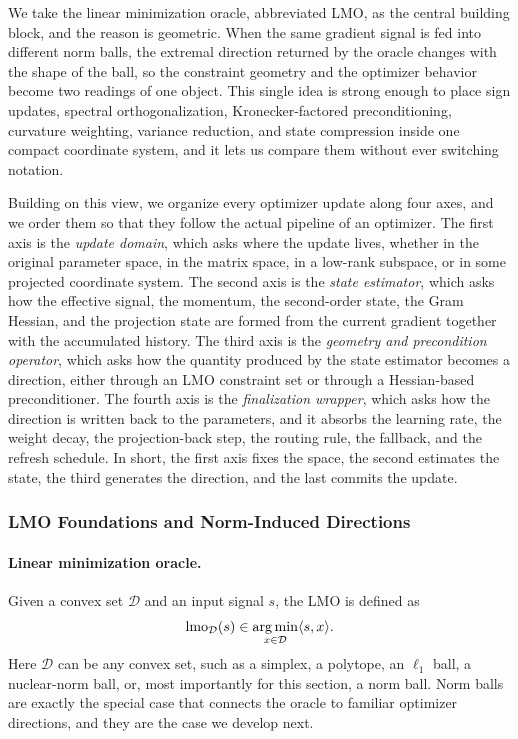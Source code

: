 We take the linear minimization oracle, abbreviated LMO, as the central building block, and the reason is geometric. When the same gradient signal is fed into different norm balls, the extremal direction returned by the oracle changes with the shape of the ball, so the constraint geometry and the optimizer behavior become two readings of one object. This single idea is strong enough to place sign updates, spectral orthogonalization, Kronecker-factored preconditioning, curvature weighting, variance reduction, and state compression inside one compact coordinate system, and it lets us compare them without ever switching notation.

Building on this view, we organize every optimizer update along four axes, and we order them so that they follow the actual pipeline of an optimizer. The first axis is the \emph{update domain}, which asks where the update lives, whether in the original parameter space, in the matrix space, in a low-rank subspace, or in some projected coordinate system. The second axis is the \emph{state estimator}, which asks how the effective signal, the momentum, the second-order state, the Gram Hessian, and the projection state are formed from the current gradient together with the accumulated history. The third axis is the \emph{geometry and precondition operator}, which asks how the quantity produced by the state estimator becomes a direction, either through an LMO constraint set or through a Hessian-based preconditioner. The fourth axis is the \emph{finalization wrapper}, which asks how the direction is written back to the parameters, and it absorbs the learning rate, the weight decay, the projection-back step, the routing rule, the fallback, and the refresh schedule. In short, the first axis fixes the space, the second estimates the state, the third generates the direction, and the last commits the update.

\subsubsection{LMO Foundations and Norm-Induced Directions}
\label{sec:lmo-foundations}

\paragraph{Linear minimization oracle.}
Given a convex set $\mathcal{D}$ and an input signal $s$, the LMO is defined as
\begin{equation}
  \operatorname{lmo}_{\mathcal{D}}(s)\in\operatorname*{arg\,min}_{x\in\mathcal{D}}\langle s,x\rangle .
  \label{eq:lmo-general}
\end{equation}
Here $\mathcal{D}$ can be any convex set, such as a simplex, a polytope, an $\ell_1$ ball, a nuclear-norm ball, or, most importantly for this section, a norm ball. Norm balls are exactly the special case that connects the oracle to familiar optimizer directions, and they are the case we develop next.

